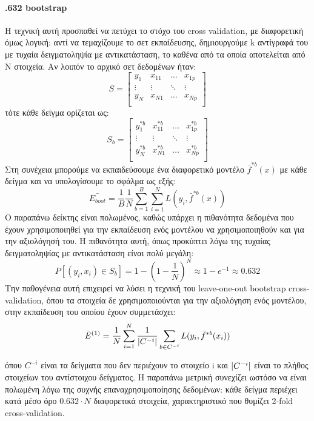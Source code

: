 \documentclass{article}
\DeclarePairedDelimiter\abs{\lvert}{\rvert}%
\begin{document}
\paragraph{.632 bootstrap} Η τεχνική αυτή προσπαθεί να πετύχει το στόχο του cross validation, με διαφορετική όμως λογική: αντί να τεμαχίζουμε το σετ εκπαίδευσης, δημιουργούμε k αντίγραφά του με τυχαία δειγματοληψία με αντικατάσταση, το καθένα από τα οποία αποτελείται από Ν στοιχεία. Αν λοιπόν το αρχικό σετ δεδομένων ήταν:
 \[
S=
\begin{bmatrix}
    y_1 &  x_{11}  & \dots  &   x_{1p} \\
    \vdots  & \vdots &\ddots & \vdots \\
    y_N &  x_{N1}  & \dots  &   x_{Np} \\
\end{bmatrix}
\]
τότε κάθε δείγμα ορίζεται ως:
 \[
S_b=
\begin{bmatrix}
    y_1^{*b} &  x_{11}^{*b}  & \dots  &   x_{1p}^{*b} \\
    \vdots  & \vdots &\ddots & \vdots \\
    y_N^{*b} &  x_{N1}^{*b}  & \dots  &   x_{Np}^{*b} \\
\end{bmatrix}
\]
Στη συνέχεια μπορούμε να εκπαιδεύσουμε ένα διαφορετικό μοντέλο $\bar{f}^{*b}(x)$ με κάθε δείγμα και να υπολογίσουμε το σφάλμα ως εξής:
$$\bar{E_{boot}}=\frac{1}{B} \frac{1}{N} \sum_{b=1}^{B} \sum_{i=1}^{N} L(y_i,\bar{f}^{*b}(x))$$
Ο παραπάνω δείκτης είναι πολωμένος, καθώς υπάρχει η πιθανότητα δεδομένα που έχουν χρησιμοποιηθεί για την εκπαίδευση ενός μοντέλου να χρησιμοποιηθούν και για την αξιολόγησή του. Η πιθανότητα αυτή, όπως προκύπτει λόγω της τυχαίας δειγματοληψίας με αντικατάσταση είναι πολύ μεγάλη:
$$P[(y_i, x_i) \in S_b]= 1- (1- \frac{1}{N})^N \approx 1- e^{-1} \approx 0.632$$
Την παθογένεια αυτή επιχειρεί να λύσει η τεχνική του leave-one-out bootstrap cross-validation, όπου τα στοιχεία δε χρησιμοποιούνται για την αξιολόγηση ενός μοντέλου, στην εκπαίδευση του οποίου έχουν συμμετάσχει:
$$\bar{E}^{(1)}= \frac{1}{N} \sum_{i=1}^{N} \frac{1}{\abs{C^{-i}}} \sum_{b \in C^{-i}} L(y_i, \bar{f}^{*b}(x_i) )$$

όπου $C^{-i}$ είναι τα δείγματα που δεν περιέχουν το στοιχείο i και $\abs{C^{-i}}$ είναι το πλήθος στοιχείων του αντίστοιχου δείγματος.
Η παραπάνω μετρική συνεχίζει ωστόσο να είναι πολωμένη λόγω της συχνής επαναχρησιμοποίησης δεδομένων: κάθε δείγμα  περιέχει κατά μέσο όρο $0.632 \cdot N$ διαφορετικά στοιχεία, χαρακτηριστικό που θυμίζει 2-fold cross-validation.
\end{document}
